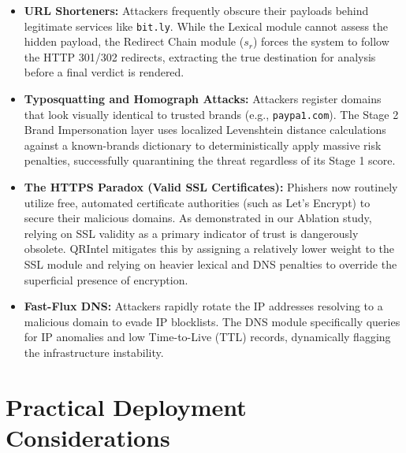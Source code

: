 \documentclass[10pt,twocolumn,letterpaper]{article}
\begin{document}
\begin{itemize}
    \item \textbf{URL Shorteners:} Attackers frequently obscure their payloads behind legitimate services like \texttt{bit.ly}. While the Lexical module cannot assess the hidden payload, the Redirect Chain module ($s_r$) forces the system to follow the HTTP 301/302 redirects, extracting the true destination for analysis before a final verdict is rendered.
    \item \textbf{Typosquatting and Homograph Attacks:} Attackers register domains that look visually identical to trusted brands (e.g., \texttt{paypa1.com}). The Stage 2 Brand Impersonation layer uses localized Levenshtein distance calculations against a known-brands dictionary to deterministically apply massive risk penalties, successfully quarantining the threat regardless of its Stage 1 score.
    \item \textbf{The HTTPS Paradox (Valid SSL Certificates):} Phishers now routinely utilize free, automated certificate authorities (such as Let's Encrypt) to secure their malicious domains. As demonstrated in our Ablation study, relying on SSL validity as a primary indicator of trust is dangerously obsolete. QRIntel mitigates this by assigning a relatively lower weight to the SSL module and relying on heavier lexical and DNS penalties to override the superficial presence of encryption.
    \item \textbf{Fast-Flux DNS:} Attackers rapidly rotate the IP addresses resolving to a malicious domain to evade IP blocklists. The DNS module specifically queries for IP anomalies and low Time-to-Live (TTL) records, dynamically flagging the infrastructure instability.
\end{itemize}

\section{Practical Deployment Considerations}
\end{document}
